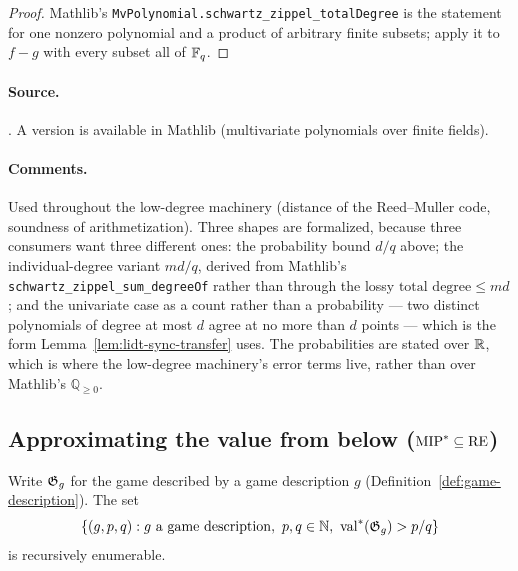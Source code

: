 \begin{proof}
\leanok
Mathlib's \texttt{MvPolynomial.schwartz\_zippel\_totalDegree} is the statement for one
nonzero polynomial and a product of arbitrary finite subsets; apply it to $f - g$ with
every subset all of $\mathbb{F}_q$.
\end{proof}

\paragraph{Source.} \cite{Sch80,Zip79}. A version is available in Mathlib
(multivariate polynomials over finite fields).

\paragraph{Comments.} Used throughout the low-degree machinery (distance of the
Reed--Muller code, soundness of arithmetization). Three shapes are formalized, because
three consumers want three different ones: the probability bound $d/q$ above; the
individual-degree variant $m d / q$, derived from Mathlib's
\texttt{schwartz\_zippel\_sum\_degreeOf} rather than through the lossy
$\text{total degree} \leq m d$; and the univariate case as a count rather than a
probability --- two distinct polynomials of degree at most $d$ agree at no more than $d$
points --- which is the form Lemma~\ref{lem:lidt-sync-transfer} uses. The probabilities
are stated over $\mathbb{R}$, which is where the low-degree machinery's error terms live, rather
than over Mathlib's $\mathbb{Q}_{\geq 0}$.

\subsection{Approximating the value from below ($\mathrm{MIP}^* \subseteq \mathrm{RE}$)}
\label{sec:rr-value-approx}

\effortMedium

\begin{lemma}
\label{lem:value-lower-approx}
\leanok
{}
Write $\mathfrak{G}_g$ for the game described by a game description $g$
(Definition~\ref{def:game-description}). The set
\[
  \{ (g, p, q) : g \text{ a game description},\ p, q \in \mathbb{N},\ \mathrm{val}^*(\mathfrak{G}_g) > p/q \}
\]
is recursively enumerable.
\end{lemma}


